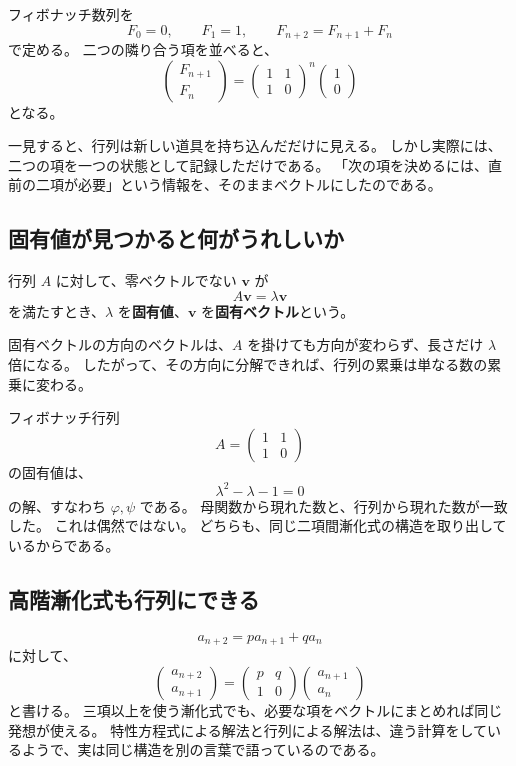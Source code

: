 フィボナッチ数列を
\[
  F_0=0,\qquad F_1=1,\qquad
  F_{n+2}=F_{n+1}+F_n
\]
で定める。
二つの隣り合う項を並べると、
\[
  \begin{pmatrix}F_{n+1}\\F_n\end{pmatrix}
  =
  \begin{pmatrix}1&1\\1&0\end{pmatrix}^{n}
  \begin{pmatrix}1\\0\end{pmatrix}
\]
となる。

一見すると、行列は新しい道具を持ち込んだだけに見える。
しかし実際には、二つの項を一つの状態として記録しただけである。
「次の項を決めるには、直前の二項が必要」という情報を、そのままベクトルにしたのである。

\subsection{固有値が見つかると何がうれしいか}

行列 $A$ に対して、零ベクトルでない $\boldsymbol v$ が
\[
  A\boldsymbol v=\lambda\boldsymbol v
\]
を満たすとき、$\lambda$ を\textbf{固有値}、$\boldsymbol v$ を\textbf{固有ベクトル}という。

固有ベクトルの方向のベクトルは、$A$ を掛けても方向が変わらず、長さだけ $\lambda$ 倍になる。
したがって、その方向に分解できれば、行列の累乗は単なる数の累乗に変わる。

フィボナッチ行列
\[
  A=\begin{pmatrix}1&1\\1&0\end{pmatrix}
\]
の固有値は、
\[
  \lambda^2-\lambda-1=0
\]
の解、すなわち $\varphi,\psi$ である。
母関数から現れた数と、行列から現れた数が一致した。
これは偶然ではない。
どちらも、同じ二項間漸化式の構造を取り出しているからである。

\subsection{高階漸化式も行列にできる}

\[
  a_{n+2}=pa_{n+1}+qa_n
\]
に対して、
\[
  \begin{pmatrix}a_{n+2}\\a_{n+1}\end{pmatrix}
  =
  \begin{pmatrix}p&q\\1&0\end{pmatrix}
  \begin{pmatrix}a_{n+1}\\a_n\end{pmatrix}
\]
と書ける。
三項以上を使う漸化式でも、必要な項をベクトルにまとめれば同じ発想が使える。
特性方程式による解法と行列による解法は、違う計算をしているようで、実は同じ構造を別の言葉で語っているのである。

